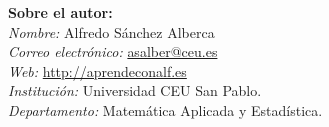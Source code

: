 \documentclass[a4paper,10pt,twoside]{article}
\begin{document}
\vspace{1cm}
\noindent\textbf{Sobre el autor:}\\
\emph{Nombre:} Alfredo Sánchez Alberca\\
\emph{Correo electrónico:} \href{mailto:asalber@ceu.es}{asalber@ceu.es}\\
\emph{Web:} \url{http://aprendeconalf.es}\\
\emph{Institución:} Universidad CEU San Pablo.\\
\emph{Departamento:} Matemática Aplicada y Estadística.
\end{document}
